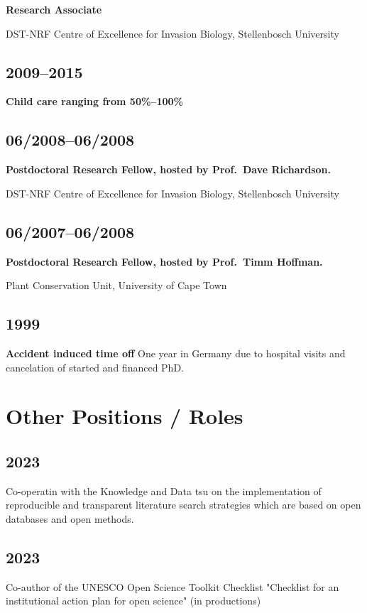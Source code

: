 \documentclass[a4paper]{article}
\begin{document}
\textbf{Research Associate}

DST-NRF Centre of Excellence for Invasion Biology, Stellenbosch University

\subsection{2009--2015 }

\textbf{Child care ranging from 50\%--100\%}


\subsection{06/2008--06/2008}

\textbf{Postdoctoral Research Fellow, hosted by Prof.\ Dave Richardson.}

DST-NRF Centre of Excellence for Invasion Biology, Stellenbosch University

\subsection{06/2007--06/2008}

\textbf{Postdoctoral Research Fellow, hosted by Prof.\ Timm Hoffman.} 

Plant Conservation Unit, University of Cape Town

\subsection{1999}
\textbf{Accident induced time off}
One year in Germany due to hospital visits and cancelation of started and financed PhD.


\section{Other Positions / Roles}

\subsection{2023} Co-operatin with the Knowledge and Data tsu on the 
implementation of reproducible and transparent literature search strategies
which are based on open databases and open methods.

\subsection{2023}
Co-author of the UNESCO Open Science Toolkit Checklist "Checklist for an
institutional action plan for open science" (in productions)
\end{document}
